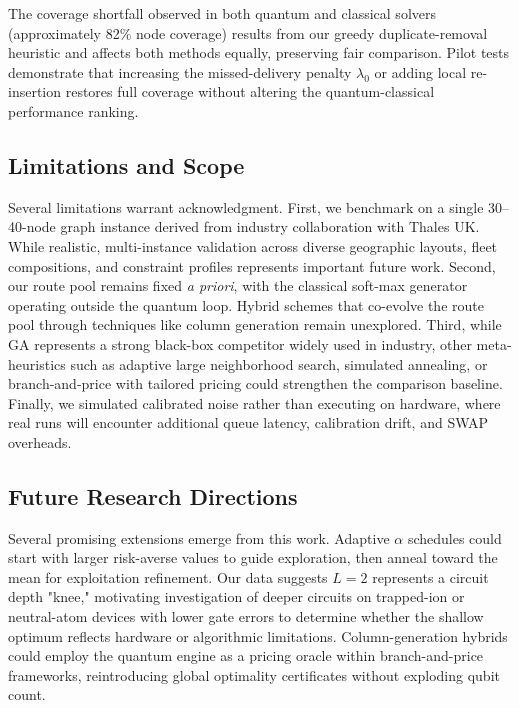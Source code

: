 The coverage shortfall observed in both quantum and classical solvers (approximately 82\% node coverage) results from our greedy duplicate-removal heuristic and affects both methods equally, preserving fair comparison. Pilot tests demonstrate that increasing the missed-delivery penalty $\lambda_0$ or adding local re-insertion restores full coverage without altering the quantum-classical performance ranking.

\subsection{Limitations and Scope}

Several limitations warrant acknowledgment. First, we benchmark on a single 30--40-node graph instance derived from industry collaboration with Thales UK. While realistic, multi-instance validation across diverse geographic layouts, fleet compositions, and constraint profiles represents important future work. Second, our route pool remains fixed \emph{a priori}, with the classical soft-max generator operating outside the quantum loop. Hybrid schemes that co-evolve the route pool through techniques like column generation remain unexplored. Third, while GA represents a strong black-box competitor widely used in industry, other meta-heuristics such as adaptive large neighborhood search, simulated annealing, or branch-and-price with tailored pricing could strengthen the comparison baseline. Finally, we simulated calibrated noise rather than executing on hardware, where real runs will encounter additional queue latency, calibration drift, and SWAP overheads.

\subsection{Future Research Directions}

Several promising extensions emerge from this work. Adaptive $\alpha$ schedules could start with larger risk-averse values to guide exploration, then anneal toward the mean for exploitation refinement. Our data suggests $L=2$ represents a circuit depth "knee," motivating investigation of deeper circuits on trapped-ion or neutral-atom devices with lower gate errors to determine whether the shallow optimum reflects hardware or algorithmic limitations. Column-generation hybrids could employ the quantum engine as a pricing oracle within branch-and-price frameworks, reintroducing global optimality certificates without exploding qubit count.

